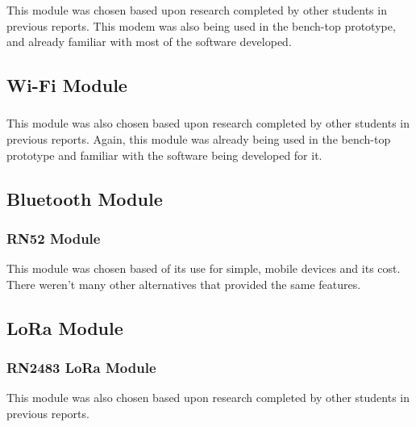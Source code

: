 	This module was chosen based upon research completed by other students in previous reports. This modem was also being used in the bench-top prototype, and already familiar with most of the software developed. 

\subsection{Wi-Fi Module}
\subsubsection{}
		This module was also chosen based upon research completed by other students in previous reports. Again, this module was already being used in the bench-top prototype and familiar with the software being developed for it. 


\subsection{Bluetooth Module}
\subsubsection{RN52 Module}
	This module was chosen based of its use for simple, mobile devices and its cost. There weren't many other alternatives that provided the same features. 


\subsection{LoRa Module}
\subsubsection{RN2483 LoRa Module}
	This module was also chosen based upon research completed by other students in previous reports.


